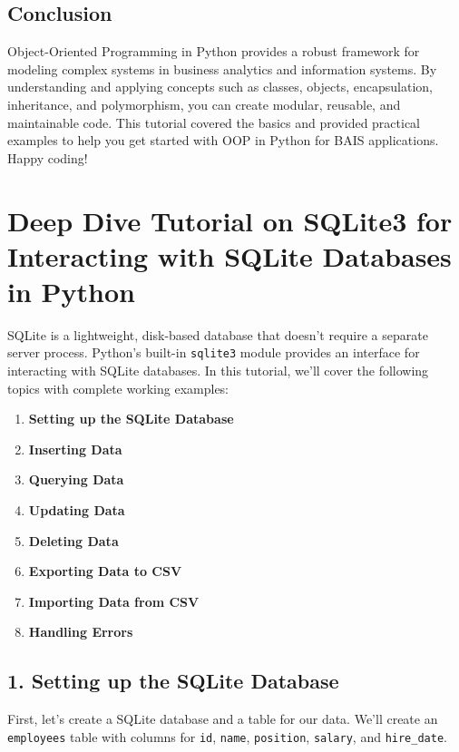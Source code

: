 \documentclass[
  letterpaper,
  DIV=11,
  numbers=noendperiod]{scrreprt}
\providecommand{\tightlist}{%
  \setlength{\itemsep}{0pt}\setlength{\parskip}{0pt}}\usepackage{longtable,booktabs,array}
\begin{document}
\section{Conclusion}\label{conclusion-14}

Object-Oriented Programming in Python provides a robust framework for
modeling complex systems in business analytics and information systems.
By understanding and applying concepts such as classes, objects,
encapsulation, inheritance, and polymorphism, you can create modular,
reusable, and maintainable code. This tutorial covered the basics and
provided practical examples to help you get started with OOP in Python
for BAIS applications. Happy coding!


\chapter{Deep Dive Tutorial on SQLite3 for Interacting with SQLite
Databases in
Python}\label{deep-dive-tutorial-on-sqlite3-for-interacting-with-sqlite-databases-in-python}

SQLite is a lightweight, disk-based database that doesn't require a
separate server process. Python's built-in \texttt{sqlite3} module
provides an interface for interacting with SQLite databases. In this
tutorial, we'll cover the following topics with complete working
examples:

\begin{enumerate}
\def\labelenumi{\arabic{enumi}.}
\tightlist
\item
  \textbf{Setting up the SQLite Database}
\item
  \textbf{Inserting Data}
\item
  \textbf{Querying Data}
\item
  \textbf{Updating Data}
\item
  \textbf{Deleting Data}
\item
  \textbf{Exporting Data to CSV}
\item
  \textbf{Importing Data from CSV}
\item
  \textbf{Handling Errors}
\end{enumerate}

\section{1. Setting up the SQLite
Database}\label{setting-up-the-sqlite-database}

First, let's create a SQLite database and a table for our data. We'll
create an \texttt{employees} table with columns for \texttt{id},
\texttt{name}, \texttt{position}, \texttt{salary}, and
\texttt{hire\_date}.
\end{document}
